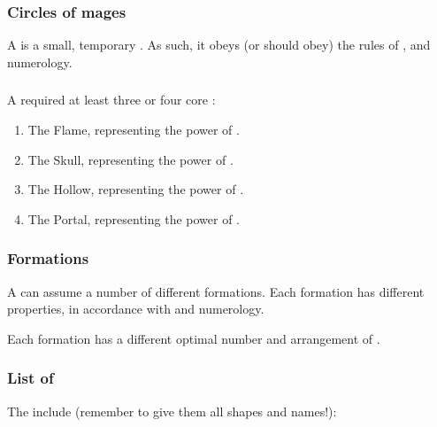 \subsubsection{Circles of mages}
A  is {a small, temporary \nexus}. 
As such, it obeys (or should obey) the rules of ,  and numerology. 





\subsubsection{\Draconic \nexuses}
A \draconic \nexus required at least three or four core \vertices: 
\begin{enumerate}
  \item The Flame, representing the power of \RuinSatha. 
  \item The Skull, representing the power of \KhothSell. 
  \item The Hollow, representing the power of \NaathKurRamalech. 
  \item The Portal, representing the power of \Achamoth. 
\end{enumerate}






\subsubsection{Formations}
A \nexus can assume a number of different formations. 
Each formation has different properties, in accordance with  and numerology. 

Each formation has a different optimal number and arrangement of . 





\subsubsection{List of \nexuses}
The \nexuses{} include (remember to give them all shapes and names!):

